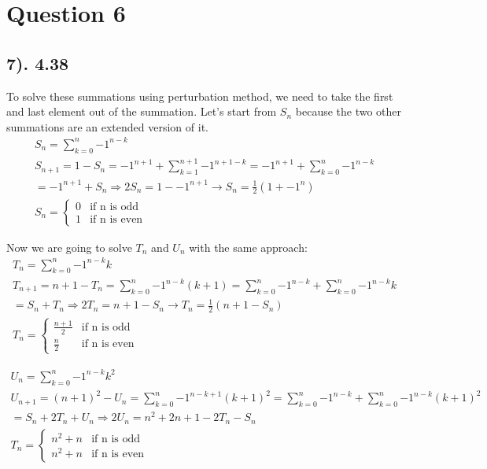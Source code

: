 \documentclass[12pt]{article}
\begin{document}
\section*{Question 6}
\subsection*{7). 4.38}
To solve these summations using perturbation method, we need to take the first and last element out of the summation. Let's start from
$S_{n}$ because the two other summations are an extended version of it.
\begin{gather*}
    S_{n} = \sum_{k=0}^n {-1}^{n-k} \\
    S_{n+1} = 1 - S_{n} = {-1}^{n+1} + \sum_{k=1}^{n+1} {-1}^{n+1-k} = {-1}^{n+1} + \sum_{k=0}^n {-1}^{n-k} \\
    = {-1}^{n+1} + S_{n} \Rightarrow 2S_{n} = 1 - {-1}^{n+1} \to S_{n} = \frac{1}{2} (1 + {-1}^n) \\
    S_{n} = \begin{cases} 0 & \text{if n is odd} \\ 1 & \text{if n is even} \end{cases}
\end{gather*}

Now we are going to solve $T_{n}$ and $U_{n}$ with the same approach:
\begin{gather*}
    T_{n} = \sum_{k=0}^n {-1}^{n-k} k \\
    T_{n+1} = n + 1 - T_{n} = \sum_{k=0}^{n} {-1}^{n-k} (k+1) = \sum_{k=0}^n {-1}^{n-k} + \sum_{k=0}^n {-1}^{n-k} k \\
    = S_{n} + T_{n} \Rightarrow 2T_{n} = n + 1 - S_{n} \to T_{n} = \frac{1}{2} (n + 1 - S_{n}) \\
    T_{n} = \begin{cases} \frac{n+1}{2} & \text{if n is odd} \\ \frac{n}{2} & \text{if n is even} \end{cases}
\end{gather*}

\begin{gather*}
    U_{n} = \sum_{k=0}^n {-1}^{n-k} k^2 \\
    U_{n+1} = {(n + 1)}^2 - U_{n} = \sum_{k=0}^{n} {-1}^{n-k+1} {(k+1)}^2 = \sum_{k=0}^n {-1}^{n-k} + \sum_{k=0}^n {-1}^{n-k} {(k+1)}^2 \\
    = S_{n} + 2T_{n} + U_{n} \Rightarrow 2U_{n} = n^2 + 2n + 1 - 2T_{n} - S_{n} \\
    T_{n} = \begin{cases} n^2 + n & \text{if n is odd} \\ n^2 + n & \text{if n is even} \end{cases}
\end{gather*}
\end{document}
